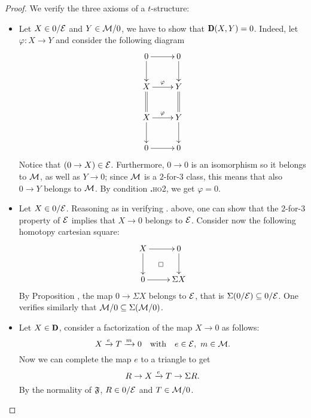 \begin{proof}
We verify the three axioms of a $t$-structure:%
\begin{itemize}%
\item Let $X\in 0/\mathcal{E}$ and $Y\in \mathcal{M}/0$, we have to show that $\cD (X,Y)=0$. Indeed, let $\varphi \colon X\to Y$ and consider the following diagram
\[
\xymatrix{
0\ar[r]\ar[d]&0\ar[d]\\
X\ar[r]^{\varphi}\ar@{=}[d]&Y\ar@{=}[d]\\
X\ar[r]^{\varphi}\ar[d]&Y\ar[d]\\
0\ar[r]&0
}
\]
Notice that $(0\to X)\in \mathcal{E}$. Furthermore, $0\to 0$ is an isomorphism so it belongs to $\mathcal{M}$, as well as $Y\to 0$; since $\mathcal{M}$ is a $2$-for-$3$ class, this means that also $0\to Y$  belongs to $\mathcal{M}$. By condition \textbf{.}\textsc{ho2}, we get $\varphi=0$.
\item Let $X\in 0/\mathcal{E}$. Reasoning as in verifying . above, one can show that the $2$-for-$3$  property of $\mathcal{E}$ implies that $X\to 0$ belongs to $\mathcal{E}$. Consider now the following homotopy cartesian square:
\[
\xymatrix{
X\ar@{}[rd]|\square\ar[r]\ar[d]&0\ar[d]\\
0\ar[r]&\Sigma X
}
\]
By Proposition , the map $0\to \Sigma X$ belongs to $\mathcal{E}$, that is $\Sigma(0/\mathcal{E})\subseteq 0/\mathcal{E}$. One verifies similarly that $\mathcal{M}/0\subseteq \Sigma(\mathcal{M}/0)$.
\item Let $X\in \cD$, consider a factorization of the map $X\to 0$ as follows:
\[
X \xto{e} T \xto{m}  0\ \ \text{ with }\ \ e\in \E,\ m\in \M.
\] 
Now we can complete the map $e$ to a triangle to get
\[
R\to X \xrightarrow{e} T\to \Sigma R.
\]
By the normality of $\mathfrak{F}$, $R\in 0/\mathcal{E}$ and $T\in \mathcal{M}/0$. \qedhere
\end{itemize}
\end{proof}




